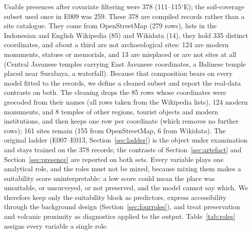 \documentclass[12pt]{article}
\begin{document}
Usable presences after covariate filtering were 378 (111--115$^\circ$E); the soil-coverage subset used once in E009 was 259.
These 378 are compiled records rather than a site catalogue.
They come from OpenStreetMap (279 rows), lists in the Indonesian and English Wikipedia (85) and Wikidata (14), they hold 335 distinct coordinates, and about a third are not archaeological sites: 124 are modern monuments, statues or memorials, and 13 are misplaced or are not sites at all (Central Javanese temples carrying East Javanese coordinates, a Balinese temple placed near Surabaya, a waterfall).
Because that composition bears on every model fitted to the records, we define a cleaned subset and report the real-data contrasts on both.
The cleaning drops the 85 rows whose coordinates were geocoded from their names (all rows taken from the Wikipedia lists), 124 modern monuments, and 8 temples of other regions, tourist objects and modern institutions, and then keeps one row per coordinate (which removes no further rows); 161 sites remain (155 from OpenStreetMap, 6 from Wikidata).
The original ladder (E007--E013, Section~\ref{sec:ladder}) is the object under examination and stays trained on the 378 records; the contrasts of Section~\ref{sec:artefact} and Section~\ref{sec:presence} are reported on both sets.
Every variable plays one analytical role, and the roles must not be mixed, because mixing them makes a suitability score uninterpretable: a low score could mean the place was unsuitable, or unsurveyed, or not preserved, and the model cannot say which.
We therefore keep only the suitability block as predictors, express accessibility through the background design (Section~\ref{sec:fourroles}), and treat preservation and volcanic proximity as diagnostics applied to the output.
Table~\ref{tab:roles} assigns every variable a single role.
\end{document}
